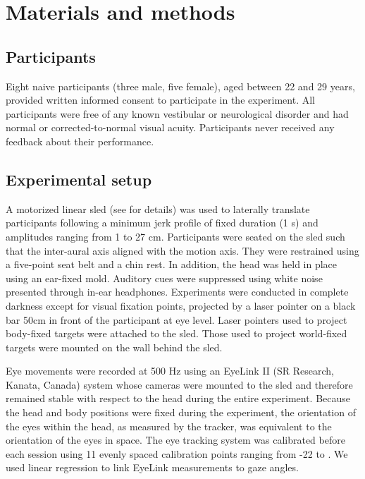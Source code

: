 \section{Materials and methods}

\subsection{Participants}

Eight naive participants (three male, five female), aged between 22 and 29 years, provided written informed consent to participate in the experiment. All participants were free of any known vestibular or neurological disorder and had normal or corrected-to-normal visual acuity. Participants never received any feedback about their performance.

\subsection{Experimental setup}

A motorized linear sled (see \cite{clemens2012} for details) was used to laterally translate participants following a minimum jerk profile of fixed duration (1 \si{\second}) and amplitudes ranging from 1 to 27 \si{\centi\metre}. Participants were seated on the sled such that the inter-aural axis aligned with the motion axis. They were restrained using a five-point seat belt and a chin rest. In addition, the head was held in place using an ear-fixed mold. Auditory cues were suppressed using white noise presented through in-ear headphones. Experiments were conducted in complete darkness except for visual fixation points, projected by a laser pointer on a black bar 50cm in front of the participant at eye level. Laser pointers used to project body-fixed targets were attached to the sled. Those used to project world-fixed targets were mounted on the wall behind the sled.

Eye movements were recorded at 500 \si{\hertz} using an EyeLink II (SR Research, Kanata, Canada) system whose cameras were mounted to the sled and therefore remained stable with respect to the head during the entire experiment. Because the head and body positions were fixed during the experiment, the orientation of the eyes within the head, as measured by the tracker, was equivalent to the orientation of the eyes in space. The eye tracking system was calibrated before each session using 11 evenly spaced calibration points ranging from -22 to . We used linear regression to link EyeLink measurements to gaze angles.

